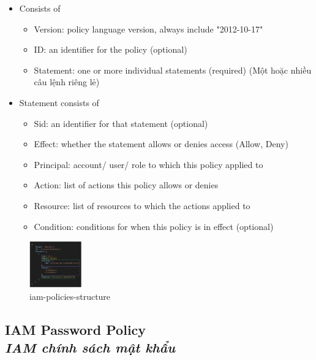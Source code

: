 \begin{itemize}
	\item Consists of
	\begin{itemize}
		\item Version: policy language version, always include "2012-10-17"
		\item ID: an identifier for the policy (optional)
		\item Statement: one or more individual statements (required) (Một hoặc nhiều câu lệnh riêng lẻ)
	\end{itemize}
	\item Statement consists of
	\begin{itemize}
		\item Sid: an identifier for that statement (optional)
		\item Effect: whether the statement allows or denies access (Allow, Deny)
		\item Principal: account/ user/ role to which this policy applied to 
		\item Action: list of actions this policy allows or denies
		\item Resource: list of resources to which the actions applied to
		\item Condition: conditions for when this policy is in effect (optional)
	\end{itemize}
\end{itemize}

\begin{figure}[htbp]
	\centering
	\includegraphics[width=0.2\textwidth]{images/iam-policies-structure}
	\caption{iam-policies-structure}
	\label{fig:iam-policies-structure}
\end{figure}


\subsection[IAM Password Policy]{IAM Password Policy \\ \textit{IAM chính sách mật khẩu}}

